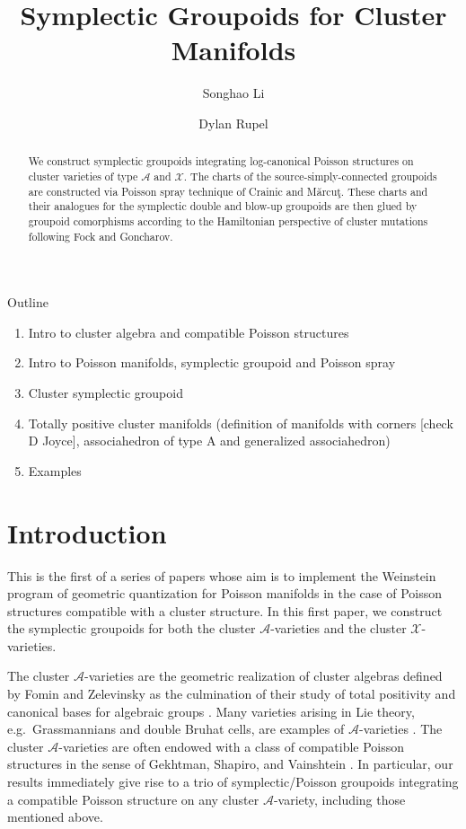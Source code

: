 \documentclass{amsart}
\title{Symplectic Groupoids for Cluster Manifolds}
\author{Songhao Li}
\author{Dylan Rupel}
\numberwithin{equation}{section}
\newcommand{\cA}{\mathcal{A}}
\newcommand{\cX}{\mathcal{X}}
\begin{document}
\begin{abstract}
  We construct symplectic groupoids integrating log-canonical Poisson structures on cluster varieties of type $\cA$ and $\cX$.
  The charts of the source-simply-connected groupoids are constructed via Poisson spray technique of Crainic and M\u{a}rcu\c{t}.
  These charts and their analogues for the symplectic double and blow-up groupoids are then glued by groupoid comorphisms according to the Hamiltonian perspective of cluster mutations following Fock and Goncharov.
\end{abstract}
\maketitle
Outline
\begin{enumerate}
	\item Intro to cluster algebra and compatible Poisson structures 
	\item Intro to Poisson manifolds, symplectic groupoid and Poisson spray
	\item Cluster symplectic groupoid
	\item Totally positive cluster manifolds (definition of manifolds with corners [check D Joyce], associahedron of type A and generalized associahedron)
	\item Examples
\end{enumerate}

\section{Introduction}
This is the first of a series of papers whose aim is to implement the Weinstein program of geometric quantization for Poisson manifolds \cite{MR1104934} in the case of Poisson structures compatible with a cluster structure.
In this first paper, we construct the symplectic groupoids for both the cluster $\cA$-varieties and the cluster $\cX$-varieties. 

The cluster $\cA$-varieties are the geometric realization of cluster algebras defined by Fomin and Zelevinsky \cite{FZ02} as the culmination of their study of total positivity and canonical bases for algebraic groups \cite{BFZ98}.
Many varieties arising in Lie theory, e.g.\ Grassmannians and double Bruhat cells, are examples of $\cA$-varieties \cite{BFZ05,scott,gekhtman-shapiro-vainshtein,Wil13b}.
The cluster $\cA$-varieties are often endowed with a class of compatible Poisson structures in the sense of Gekhtman, Shapiro, and Vainshtein \cite{GSV10}.
In particular, our results immediately give rise to a trio of symplectic/Poisson groupoids integrating a compatible Poisson structure on any cluster $\cA$-variety, including those mentioned above. 
\end{document}
